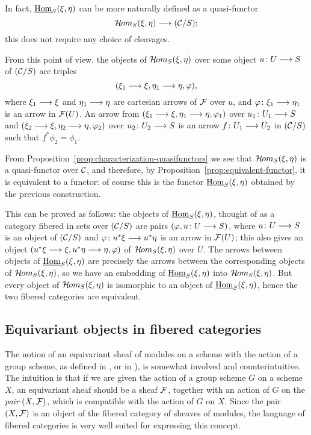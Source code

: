 \begin{3   FIBERED CATEGORIES}
\begin{3.7 The functors of arrows of a fibcat}
In fact, $\mathop{\underline{\mathrm{Hom}}}\nolimits_S(\xi, \eta)$ can be more naturally defined as a quasi-functor
   \[
   \curshom_S(\xi, \eta) \arr (\cC/S);
   \]
this does not require any choice of cleavages.

From this point of view, the objects of $\mathop{\mathcal{H}\hskip -.8pt om}\nolimits_S(\xi, \eta)$ over some object $u \colon U \arr S$ of $(\mathcal{C}/S)$ are triples
   \[
   (\xi_1 \arr \xi, \eta_1 \arr \eta, \phi),
   \]
where $\xi_1 \arr \xi$ and $\eta_1 \arr \eta$ are cartesian arrows of $\mathcal{F}$ over $u$, and $\phi \colon \xi_1 \arr \eta_1$ is an arrow in $\mathcal{F}(U)$. An arrow from $(\xi_1 \arr \xi, \eta_1 \arr \eta, \phi_1)$ over $u_1 \colon U_1 \arr S$ and $(\xi_2 \arr \xi, \eta_2 \arr \eta, \phi_2)$ over $u_2 \colon U_2 \arr S$ is an arrow $f \colon U_1 \arr U_2$ in $(\mathcal{C}/S)$ such that $f^*\phi_2 = \phi_1$.

From Proposition~\ref{prop:characterization-quasifunctors} we see that $\mathop{\mathcal{H}\hskip -.8pt om}\nolimits_S(\xi, \eta)$ is a quasi-functor over $\mathcal{C}$, and therefore, by Proposition~\ref{prop:equivalent-functor}, it is equivalent to a functor: of course this is the functor $\mathop{\underline{\mathrm{Hom}}}\nolimits_S(\xi, \eta)$ obtained by the previous construction.

This can be proved as follows: the objects of $\mathop{\underline{\mathrm{Hom}}}\nolimits_S(\xi, \eta)$, thought of as a category fibered in sets over $(\mathcal{C}/S)$ are pairs $(\phi, u \colon U \arr S)$, where $u \colon U \arr S$ is an object of $(\mathcal{C}/S)$ and $\phi \colon u^* \xi \arr u^* \eta$ is an arrow in $\mathcal{F}(U)$; this also gives an object $(u^* \xi \arr \xi, u^*\eta \arr \eta, \phi)$ of $\mathop{\mathcal{H}\hskip -.8pt om}\nolimits_S(\xi, \eta)$ over $U$. The arrows between objects of $\mathop{\underline{\mathrm{Hom}}}\nolimits_S(\xi, \eta)$ are precisely the arrows between the corresponding objects of $\mathop{\mathcal{H}\hskip -.8pt om}\nolimits_S(\xi, \eta)$, so we have an embedding of $\mathop{\underline{\mathrm{Hom}}}\nolimits_S(\xi, \eta)$ into $\mathop{\mathcal{H}\hskip -.8pt om}\nolimits_S(\xi, \eta)$. But every object of $\mathop{\mathcal{H}\hskip -.8pt om}\nolimits_S(\xi, \eta)$ is isomorphic to an object of $\mathop{\underline{\mathrm{Hom}}}\nolimits_S(\xi, \eta)$, hence the two fibered categories are equivalent.


\end{3.7 The functors of arrows of a fibcat}
\begin{3.8 Equivariant objects in fibcats}
\setcounter{section}{7}
\section{Equivariant objects in fibered categories}
\label{sec:fibered-actions}
\setcounter{theorem}{45}

The notion of an equivariant sheaf of modules on a scheme with the action of a group scheme, as defined in \cite[Chapter~1, \S~3]{git}, or in \cite{thomason87}), is somewhat involved and counterintuitive. The intuition is that if we are given the action of a group scheme $G$ on a scheme $X$, an equivariant sheaf should be a sheaf $\mathcal{F}$, together with an action of $G$ on the \emph{pair} $(X, \mathcal{F})$, which is compatible with the action of $G$ on $X$. Since the pair $(X, \mathcal{F})$ is an object of the fibered category of sheaves of modules, the language of fibered categories is very well suited for expressing this concept.


\end{3.8 Equivariant objects in fibcats}
\end{3   FIBERED CATEGORIES}
